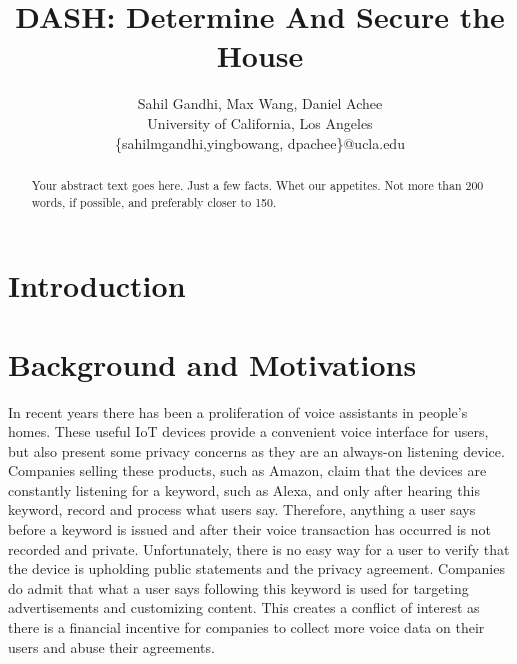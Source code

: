 \documentclass[letterpaper,twocolumn,10pt]{article}
\begin{document}

\date{}

\title{\Large \bf DASH: Determine And Secure the House}

\author{
{\rm Sahil Gandhi, Max Wang, Daniel Achee}\\
University of California, Los Angeles \\
\{sahilmgandhi,yingbowang, dpachee\}@ucla.edu
} %

\maketitle

\begin{abstract}
Your abstract text goes here. Just a few facts. Whet our appetites.
Not more than 200 words, if possible, and preferably closer to 150.
\end{abstract}

\section{Introduction}


\section{Background and Motivations}

In recent years there has been a proliferation of voice assistants in people’s homes. These useful IoT devices provide a convenient voice interface for users, but also present some privacy concerns as they are an always-on listening device. Companies selling these products, such as Amazon, claim that the devices are constantly listening for a keyword, such as Alexa, and only after hearing this keyword, record and process what users say. Therefore, anything a user says before a keyword is issued and after their voice transaction has occurred is not recorded and private. Unfortunately, there is no easy way for a user to verify that the device is upholding public statements and the privacy agreement. Companies do admit that what a user says following this keyword is used for targeting advertisements and customizing content. This creates a conflict of interest as there is a financial incentive for companies to collect more voice data on their users and abuse their agreements.
\end{document}
